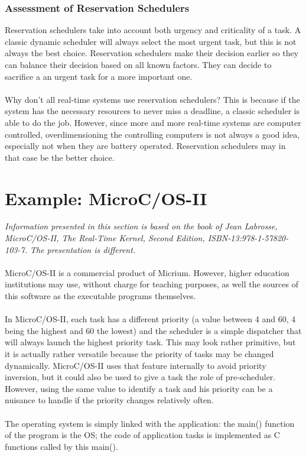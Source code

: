 \subsubsection{Assessment of Reservation Schedulers}
Reservation schedulers take into account both urgency and criticality of a task. A classic dynamic scheduler will always select the most urgent task, but this is not always the best choice. Reservation schedulers make their decision earlier so they can balance their decision based on all known factors. They can decide to sacrifice a an urgent task for a more important one.
\\\\
Why don't all real-time systems use reservation schedulers? This is because if the system has the necessary resources to never miss a deadline, a classic scheduler is able to do the job. However, since more and more real-time systems are computer controlled, overdimensioning the controlling computers is not always a good idea, especially not when they are battery operated. Reservation schedulers may in that case be the better choice.

\section{Example: MicroC/OS-II}
\textit{Information presented in this section is based on the book of Jean Labrosse, MicroC/OS-II, The Real-Time Kernel, Second Edition, ISBN-13:978-1-57820-103-7. The presentation is different.}
\\\\
MicroC/OS-II is a commercial product of Micrium. However, higher education institutions may use, without charge for teaching purposes, as well the sources of this software as the executable programs themselves.
\\\\
In MicroC/OS-II, each task has a different priority (a value between 4 and 60, 4 being the highest and 60 the lowest) and the scheduler is a simple dispatcher that will always launch the highest priority task. This may look rather primitive, but it is actually rather versatile because the priority of tasks may be changed dynamically. MicroC/OS-II uses that feature internally to avoid priority inversion, but it could also be used to give a task the role of pre-scheduler. However, using the same value to identify a task and his priority can be a nuisance to handle if the priority changes relatively often.
\\\\
The operating system is simply linked with the application: the main() function of the program is the OS; the code of application tasks is implemented as C functions called by this main().


